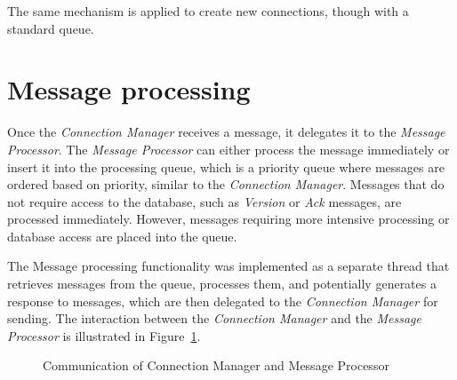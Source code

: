 The same mechanism is applied to create new connections, though with a standard queue.


\section{Message processing}

Once the \emph{Connection Manager} receives a message, it delegates it to the \emph{Message Processor}. The \emph{Message Processor} can either process the message immediately or insert it into the processing queue, which is a priority queue where messages are ordered based on priority, similar to the \emph{Connection Manager}. Messages that do not require access to the database, such as \emph{Version} or \emph{Ack} messages, are processed immediately. However, messages requiring more intensive processing or database access are placed into the queue.

The Message processing functionality was implemented as a separate thread that retrieves messages from the queue, processes them, and potentially generates a response to messages, which are then delegated to the \emph{Connection Manager} for sending. The interaction between the \emph{Connection Manager} and the \emph{Message Processor} is illustrated in Figure~\ref{figure:my.CM-MP}.

\begin{figure}[h]
    \begin{center}
    \end{center}
    \caption{Communication of Connection Manager and Message Processor}
    \label{figure:my.CM-MP}
\end{figure}


